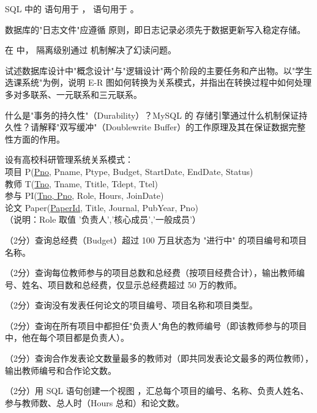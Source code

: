 \documentclass[a4paper,11pt]{article}
\begin{document}
\q SQL 中的  语句用于 \fillblank ， 语句用于 \fillblank 。

\q 数据库的"日志文件"应遵循 \fillblank 原则，即日志记录必须先于数据更新写入稳定存储。

\q 在  中， 隔离级别通过 \fillblank 机制解决了幻读问题。


\q 试述数据库设计中"概念设计"与"逻辑设计"两个阶段的主要任务和产出物。以"学生选课系统"为例，说明 E-R 图如何转换为关系模式，并指出在转换过程中如何处理多对多联系、一元联系和三元联系。
\anslines{3cm}

\q 什么是"事务的持久性"（Durability）？MySQL 的  存储引擎通过什么机制保证持久性？请解释"双写缓冲"（Doublewrite Buffer）的工作原理及其在保证数据完整性方面的作用。
\anslines{3cm}


设有高校科研管理系统关系模式：\\
项目 P(\underline{Pno}, Pname, Ptype, Budget, StartDate, EndDate, Status)\\
教师 T(\underline{Tno}, Tname, Ttitle, Tdept, Ttel)\\
参与 PI(\underline{Tno, Pno}, Role, Hours, JoinDate)\\
论文 Paper(\underline{PaperId}, Title, Journal, PubYear, Pno)\\
（说明：Role 取值 '负责人','核心成员','一般成员'）

\q （2分）查询总经费（Budget）超过 100 万且状态为 "进行中" 的项目编号和项目名称。
\anslines{1cm}

\q （2分）查询每位教师参与的项目总数和总经费（按项目经费合计），输出教师编号、姓名、项目数和总经费，仅显示总经费超过 50 万的教师。
\anslines{1.2cm}

\q （2分）查询没有发表任何论文的项目编号、项目名称和项目类型。
\anslines{1cm}

\q （2分）查询在所有项目中都担任"负责人"角色的教师编号（即该教师参与的项目中，他在每个项目都是负责人）。
\anslines{1.2cm}

\q （2分）查询合作发表论文数量最多的教师对（即共同发表论文最多的两位教师），输出教师编号和合作论文数。
\anslines{1.2cm}

\q （2分）用 SQL 语句创建一个视图 ，汇总每个项目的编号、名称、负责人姓名、参与教师数、总人时（Hours 总和）和论文数。
\anslines{1.5cm}
\end{document}
